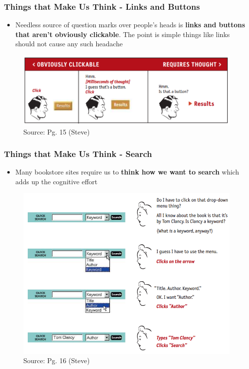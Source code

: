 \documentclass{beamer}
\begin{document}
\begin{frame}
	\frametitle{Things that Make Us Think - Links and Buttons}
	\begin{itemize}
		\item Needless source of question marks over people's heads is \textbf{links and buttons that aren't obviously clickable}.  The point is simple things like links should not cause any such headache
	\end{itemize}
	\centering
	\begin{figure}
		\includegraphics[width=0.8\linewidth]{steve/links}
		\caption{Source: Pg. 15 (Steve)}
	\end{figure}
\end{frame}

\begin{frame}
	\frametitle{Things that Make Us Think - Search}
	\begin{itemize}
		\item Many bookstore sites require us to \textbf{think how we want to search} which adds up the cognitive effort 
	\end{itemize}
	\centering
	\begin{figure}
		\includegraphics[width=0.5\linewidth]{steve/search}
		\caption{Source: Pg. 16 (Steve)}
	\end{figure}
\end{frame}
\end{document}
